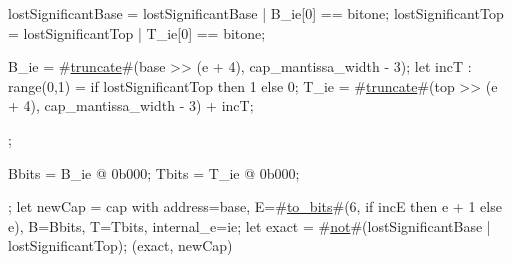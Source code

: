 {{{      lostSignificantBase = lostSignificantBase | B_ie[0] == bitone;
      lostSignificantTop  = lostSignificantTop | T_ie[0] == bitone;

      B_ie = #\hyperref[sailRISCVztruncate]{truncate}#(base >> (e + 4), cap_mantissa_width - 3);
      let incT : range(0,1) = if lostSignificantTop then 1 else 0;
      T_ie = #\hyperref[sailRISCVztruncate]{truncate}#(top >> (e + 4), cap_mantissa_width - 3) + incT;
    };

    Bbits = B_ie @ 0b000;
    Tbits = T_ie @ 0b000;
  };
  let newCap = {cap with address=base, E=#\hyperref[sailRISCVztozybits]{to\_bits}#(6, if incE then e + 1 else e), B=Bbits, T=Tbits, internal_e=ie};
  let exact = #\hyperref[sailRISCVznot]{not}#(lostSignificantBase | lostSignificantTop);
  (exact, newCap)
}
